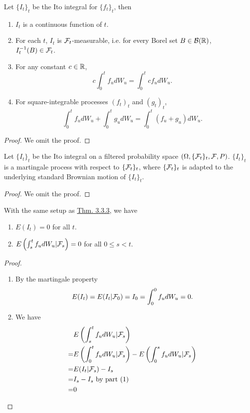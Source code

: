 \documentclass[11pt,fleqn]{book} %
\begin{document}
\begin{proposition} \label{prop:332}
Let \(\{I_t\}_t\) be the Ito integral for \(\{f_t\}_t\), then
\begin{enumerate}
    \item \(I_t\) is a continuous function of \(t\).
    \item For each \(t\), \(I_t\) is \(\mathcal{F}_t\)-measurable, i.e. for every Borel set \(B \in \mathcal{B}(\mathbb{R})\), \(I_t^{-1}(B) \in \mathcal{F}_t\).
    \item For any constant \(c \in \mathbb{R}\), 
    \[
    c\int_0^t f_udW_u  = \int_0^t cf_u dW_u.
    \]
    \item For square-integrable processes \((f_t)_t\) and \((g_t)_t\),
    \[
    \int_0^t f_udW_u + \int_0^t g_udW_u = \int_0^t(f_u + g_u)dW_u.
    \]
\end{enumerate}
\end{proposition}
\begin{proof}
    We omit the proof.
\end{proof}

\begin{theorem} \label{thm:333}
Let \(\{I_t\}_t\) be the Ito integral on a filtered probability space \((\Omega, \{\mathcal{F}_t\}_t, \mathcal{F}, P)\). \(\{I_t\}_t\) is a martingale process with respect to \(\{\mathcal{F}_t\}_t\), where \(\{\mathcal{F}_t\}_t\) is adapted to the underlying standard Brownian motion of \(\{I_t\}_t\).
\end{theorem}
\begin{proof}
    We omit the proof.
\end{proof}

\begin{corollary} \label{cor:334}
With the same setup as \hyperref[thm:333]{Thm. 3.3.3}, we have
\begin{enumerate}
    \item \(E(I_t) = 0\) for all \(t\).
    \item \(E\left(\int_s^t f_udW_u|\mathcal{F}_s\right) = 0\) for all \(0 \leq s < t\).
\end{enumerate}
\end{corollary}
\begin{proof}
\begin{enumerate}
    \item By the martingale property
    \[
    E(I_t) = E(I_t|\mathcal{F}_0) = I_0 = \int_0^0f_udW_u = 0.
    \]
    \item We have
    \[
    \begin{aligned}
    &E\left(\int_s^t f_udW_u|\mathcal{F}_s\right) \\
    = &E\left(\int_0^tf_udW_u|\mathcal{F}_s\right) - E\left(\int_0^s f_udW_u|\mathcal{F}_s\right) \\
    = &E(I_t|\mathcal{F}_s) - I_s \\
    = &I_s - I_s \text{ by part (1)} \\
    = &0
    \end{aligned}
    \]
\end{enumerate}
\end{proof}
\end{document}
